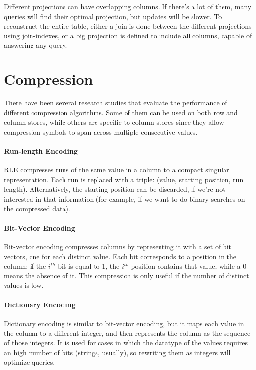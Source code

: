 Different projections can have overlapping columns. If there's a lot of them, many queries will find their optimal projection, but updates will be slower. To reconstruct the entire table, either a join is done between the different projections using join-indexes, or a big projection is defined to include all columns, capable of answering any query.

\section{Compression}

There have been several research studies that evaluate the performance of different compression algorithms. Some of them can be used on both row and column-stores, while others are specific to column-stores since they allow compression symbols to span across multiple consecutive values.

\paragraph{Run-length Encoding}
RLE compresses runs of the same value in a column to a compact singular representation. Each run is replaced with a triple: (value, starting position, run length). Alternatively, the starting position can be discarded, if we're not interested in that information (for example, if we want to do binary searches on the compressed data).

\paragraph{Bit-Vector Encoding}
Bit-vector encoding compresses columns by representing it with a set of bit vectors, one for each distinct value. Each bit corresponds to a position in the column: if the $i^{th}$ bit is equal to 1, the $i^{th}$ position contains that value, while a 0 means the absence of it. This compression is only useful if the number of distinct values is low.

\paragraph{Dictionary Encoding}
Dictionary encoding is similar to bit-vector encoding, but it maps each value in the column to a different integer, and then represents the column as the sequence of those integers.  It is used for cases in which the datatype of the values requires an high number of bits (strings, usually), so rewriting them as integers will optimize queries. 

